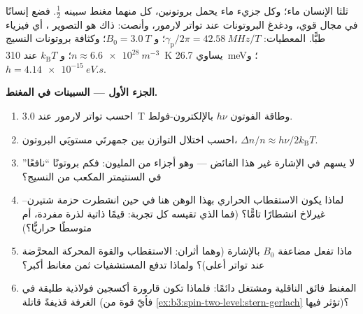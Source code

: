 \begin{problem}\label{pb:b3:spin-two-level:1}
ثلثا الإنسان ماء؛ وكل جزيء ماء يحمل بروتونين، كل منهما
مغنط سبينه $\tfrac12$. فضع إنسانًا في مجال قوي، ودغدغ
البروتونات عند تواتر لارمور، وأنصت: ذاك هو
التصوير ، أي فيزياء  طبًّا. المعطيات:
$\gamma_{\text{p}}/2\pi = \qty{42.58}{MHz/T}$؛ و $B_0 = \qty{3.0}{T}$؛
وكثافة بروتونات النسيج $n \approx \qty{6.6e28}{m^{-3}}$؛
و $k_{\text{B}}T$ عند \qty{310}{K} يساوي \qty{26.7}{meV}؛ و $h =
\qty{4.14e-15}{eV.s}$.

\medskip\noindent\textbf{الجزء الأول --- السبينات في المغنط.}
\begin{enumerate}
  \item احسب تواتر لارمور عند \qty{3.0}{T} وطاقة الفوتون
        $h\nu$ بالإلكترون-فولط.
  \item احسب اختلال التوازن بين جمهرتَي مستويَي البروتون،
        $\Delta n/n \approx h\nu/2k_{\text{B}}T$.
  \item لا يسهم في الإشارة غير هذا الفائض --- وهو أجزاء من
        المليون: فكم بروتونًا ``نافعًا'' في السنتيمتر المكعب من
        النسيج؟
  \item لماذا يكون الاستقطاب الحراري بهذا الوهن هنا في حين انشطرت
        حزمة شتيرن--غيرلاخ انشطارًا تامًّا؟ (فما الذي تقيسه كل
        تجربة: قيمًا ذاتية لذرة مفردة، أم متوسطًا حراريًّا؟)
  \item ماذا تفعل مضاعفة $B_0$ بالإشارة (وهما أثران:
        الاستقطاب والقوة المحركة المحرَّضة عند تواتر أعلى)؟ ولماذا
        تدفع المستشفيات ثمن مغانط أكبر؟
  \item المغنط فائق الناقلية ومشتغل دائمًا: فلماذا تكون قارورة
        أكسجين فولاذية طليقة في الغرفة قذيفةً قاتلة
        (فأيّ قوة من \cref{ex:b3:spin-two-level:stern-gerlach}
        تؤثر فيها)؟
\end{enumerate}


\end{problem}
